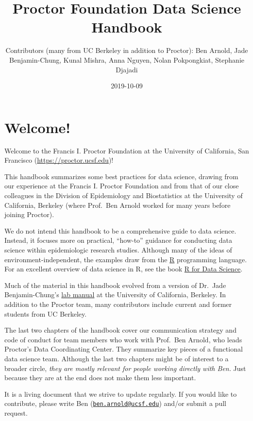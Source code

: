 \documentclass[]{book}
\title{Proctor Foundation Data Science Handbook}
\author{Contributors (many from UC Berkeley in addition to Proctor): Ben Arnold, Jade Benjamin-Chung, Kunal Mishra, Anna Nguyen, Nolan Pokpongkiat, Stephanie Djajadi}
\date{2019-10-09}
\begin{document}
\maketitle

{
\setcounter{tocdepth}{1}
\tableofcontents
}
\hypertarget{welcome}{%
\chapter*{Welcome!}\label{welcome}}

Welcome to the Francis I. Proctor Foundation at the University of California, San Francisco (\url{https://proctor.ucsf.edu})!

This handbook summarizes some best practices for data science, drawing from our experience at the Francis I. Proctor Foundation and from that of our close colleagues in the Division of Epidemiology and Biostatistics at the University of California, Berkeley (where Prof.~Ben Arnold worked for many years before joining Proctor).

We do not intend this handbook to be a comprehensive guide to data science. Instead, it focuses more on practical, ``how-to'' guidance for conducting data science within epidemiologic research studies. Although many of the ideas of environment-independent, the examples draw from the \href{https://cran.r-project.org/}{R} programming language. For an excellent overview of data science in R, see the book \href{https://r4ds.had.co.nz/}{R for Data Science}.

Much of the material in this handbook evolved from a version of Dr.~Jade Benjamin-Chung's \href{https://github.com/jadebc-berkeley/lab-manual}{lab manual} at the University of California, Berkeley. In addition to the Proctor team, many contributors include current and former students from UC Berkeley.

The last two chapters of the handbook cover our communication strategy and code of conduct for team members who work with Prof.~Ben Arnold, who leads Proctor's Data Coordinating Center. They summarize key pieces of a functional data science team. Although the last two chapters might be of interest to a broader circle, \emph{they are mostly relevant for people working directly with Ben.} Just because they are at the end does not make them less important.

It is a living document that we strive to update regularly. If you would like to contribute, please write Ben (\href{mailto:ben.arnold@ucsf.edu}{\nolinkurl{ben.arnold@ucsf.edu}}) and/or submit a pull request.
\end{document}
